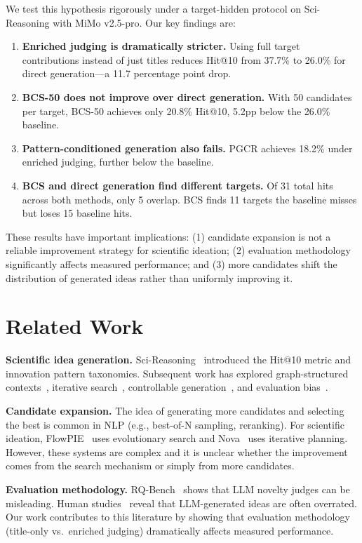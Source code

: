 \documentclass[wcp]{jmlr}
\begin{document}
We test this hypothesis rigorously under a target-hidden protocol on Sci-Reasoning with MiMo v2.5-pro. Our key findings are:

\begin{enumerate}
\item \textbf{Enriched judging is dramatically stricter.} Using full target contributions instead of just titles reduces Hit@10 from 37.7\% to 26.0\% for direct generation---a 11.7 percentage point drop.
\item \textbf{BCS-50 does not improve over direct generation.} With 50 candidates per target, BCS-50 achieves only 20.8\% Hit@10, 5.2pp below the 26.0\% baseline.
\item \textbf{Pattern-conditioned generation also fails.} PGCR achieves 18.2\% under enriched judging, further below the baseline.
\item \textbf{BCS and direct generation find different targets.} Of 31 total hits across both methods, only 5 overlap. BCS finds 11 targets the baseline misses but loses 15 baseline hits.
\end{enumerate}

These results have important implications: (1) candidate expansion is not a reliable improvement strategy for scientific ideation; (2) evaluation methodology significantly affects measured performance; and (3) more candidates shift the distribution of generated ideas rather than uniformly improving it.

\section{Related Work}\label{sec:related}

\textbf{Scientific idea generation.} Sci-Reasoning~\cite{liu2025scireasoning} introduced the Hit@10 metric and innovation pattern taxonomies. Subsequent work has explored graph-structured contexts~\cite{graph2idea}, iterative search~\cite{flowpie, nova}, controllable generation~\cite{ldc, sciidea}, and evaluation bias~\cite{rqbench}.

\textbf{Candidate expansion.} The idea of generating more candidates and selecting the best is common in NLP (e.g., best-of-N sampling, reranking). For scientific ideation, FlowPIE~\cite{flowpie} uses evolutionary search and Nova~\cite{nova} uses iterative planning. However, these systems are complex and it is unclear whether the improvement comes from the search mechanism or simply from more candidates.

\textbf{Evaluation methodology.} RQ-Bench~\cite{rqbench} shows that LLM novelty judges can be misleading. Human studies~\cite{humanstudy} reveal that LLM-generated ideas are often overrated. Our work contributes to this literature by showing that evaluation methodology (title-only vs.\ enriched judging) dramatically affects measured performance.
\end{document}
